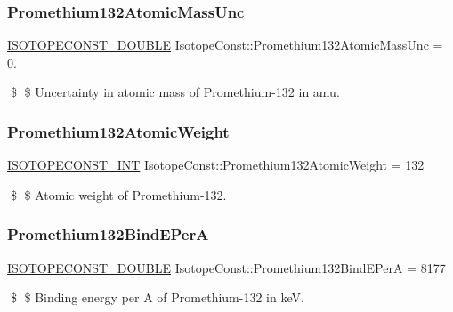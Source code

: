 \subsubsection{\texorpdfstring{Promethium132\+Atomic\+Mass\+Unc}{Promethium132AtomicMassUnc}}
{\footnotesize\ttfamily \mbox{\hyperlink{group___isotope_const-_macros_ga8f45a7272ce02c0b4c65c44636ed719a}{I\+S\+O\+T\+O\+P\+E\+C\+O\+N\+S\+T\+\_\+\+D\+O\+U\+B\+LE}} Isotope\+Const\+::\+Promethium132\+Atomic\+Mass\+Unc = 0.}

\$ \$ Uncertainty in atomic mass of Promethium-\/132 in amu. \mbox{\label{group___isotope_const-_promethium-_pm132_ga703fb36cd752b4f14e1c11f409abe3de}} 
\subsubsection{\texorpdfstring{Promethium132\+Atomic\+Weight}{Promethium132AtomicWeight}}
{\footnotesize\ttfamily \mbox{\hyperlink{group___isotope_const-_macros_ga5f18360b3e99483a35c32d789e62621c}{I\+S\+O\+T\+O\+P\+E\+C\+O\+N\+S\+T\+\_\+\+I\+NT}} Isotope\+Const\+::\+Promethium132\+Atomic\+Weight = 132}

\$ \$ Atomic weight of Promethium-\/132. \mbox{\label{group___isotope_const-_promethium-_pm132_ga6aaf4787aab689a02f2a6f9516f61084}} 
\subsubsection{\texorpdfstring{Promethium132\+Bind\+E\+PerA}{Promethium132BindEPerA}}
{\footnotesize\ttfamily \mbox{\hyperlink{group___isotope_const-_macros_ga8f45a7272ce02c0b4c65c44636ed719a}{I\+S\+O\+T\+O\+P\+E\+C\+O\+N\+S\+T\+\_\+\+D\+O\+U\+B\+LE}} Isotope\+Const\+::\+Promethium132\+Bind\+E\+PerA = 8177}

\$ \$ Binding energy per A of Promethium-\/132 in keV. \mbox{\label{group___isotope_const-_promethium-_pm132_ga5ea65edaf2476c3f262633494c75baa2}} 

